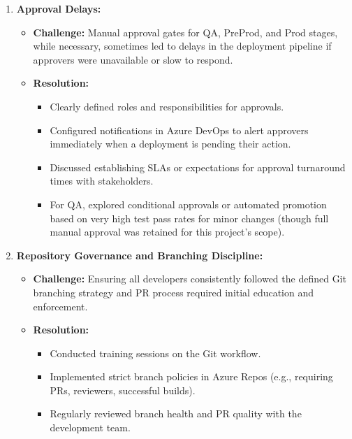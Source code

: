 \begin{enumerate}
    \item \textbf{Approval Delays:}
    \begin{itemize}
        \item \textbf{Challenge:} Manual approval gates for QA, PreProd, and Prod stages, while necessary, sometimes led to delays in the deployment pipeline if approvers were unavailable or slow to respond.
        \item \textbf{Resolution:}
        \begin{itemize}
            \item Clearly defined roles and responsibilities for approvals.
            \item Configured notifications in Azure DevOps to alert approvers immediately when a deployment is pending their action.
            \item Discussed establishing SLAs or expectations for approval turnaround times with stakeholders.
            \item For QA, explored conditional approvals or automated promotion based on very high test pass rates for minor changes (though full manual approval was retained for this project's scope).
        \end{itemize}
    \end{itemize}

    \item \textbf{Repository Governance and Branching Discipline:}
    \begin{itemize}
        \item \textbf{Challenge:} Ensuring all developers consistently followed the defined Git branching strategy and PR process required initial education and enforcement.
        \item \textbf{Resolution:}
        \begin{itemize}
            \item Conducted training sessions on the Git workflow.
            \item Implemented strict branch policies in Azure Repos (e.g., requiring PRs, reviewers, successful builds).
            \item Regularly reviewed branch health and PR quality with the development team.
        \end{itemize}
    \end{itemize}


\end{enumerate}
